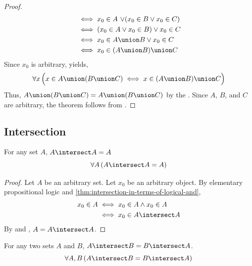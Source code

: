 \begin{proof}
\begin{align*}
        &\iff
        x_{0} \in A \,\,{\lor} \mleft( x_{0} \in B \lor x_{0} \in C \mright)\\
        &\iff
        \mleft( x_{0} \in A \lor x_{0} \in B \mright) \lor x_{0} \in C\\
        &\iff
        x_{0} \in A \union B \lor x_{0} \in C\\
        &\iff
        x_{0} \in \mleft( A \union B \mright) \union C
    \end{align*}
    Since \( x_{0} \) is arbitrary,  yields,
    \begin{equation*}
        \forall x \, \Big( x \in A \union \mleft( B \union C \mright) \iff
        x \in \mleft( A \union B \mright) \union C  \Big)
    \end{equation*}
    Thus, \( A \union \mleft( B \union C \mright) = A \union \mleft( B \union C \mright) \) by the .
    Since \( A \), \( B \), and \( C \) are arbitrary, the theorem follows from .
\end{proof}
\subsection{Intersection}
\begin{thm}[Idempotence]
    \label{set-identities:idempotence-of-intersections}
    For any set \( A \), \( A \intersect A = A \)
    \begin{equation*}
        \forall A \, \mleft( A \intersect A = A \mright)
    \end{equation*}
\end{thm}

\begin{proof}
    Let \( A \) be an arbitrary set. Let \( x_{0} \) be an arbitrary object.
    By elementary propositional logic and \cref{thm:intersection-in-terms-of-logical-and},
    \begin{align*}
        x_{0} \in A
        &\iff
        x_{0} \in A \land x_{0} \in A \\
        &\iff
        x_{0} \in A \intersect A
    \end{align*}
    By  and , \( A = A \intersect A \).
\end{proof}

\begin{thm}[Commutativity]
    \label{set-identities:commutativity-of-intersection}
    For any two sets \( A \) and \( B \), \( A \intersect B = B \intersect A\).
    \begin{equation*}
        \forall A,B \, \mleft( A \intersect B = B \intersect A \mright)
    \end{equation*}
\end{thm}

